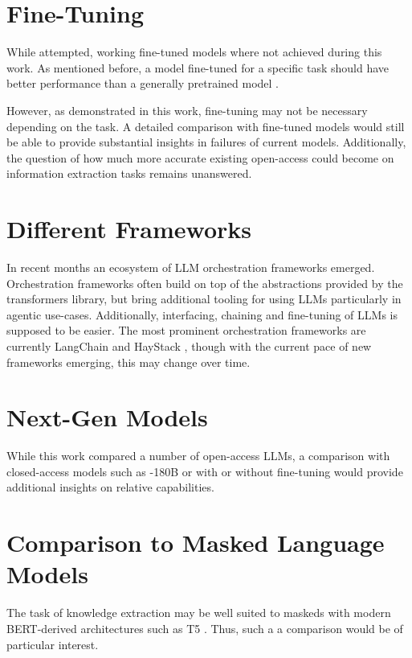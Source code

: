 \section{Fine-Tuning}\label{sec:out:sft}
While attempted, working fine-tuned models where not achieved during this work.
As mentioned before, a model fine-tuned for a specific task should have better performance than a generally pretrained model \cite{zhao_finetuning_2021}.

However, as demonstrated in this work, fine-tuning may not be necessary depending on the task.
A detailed comparison with fine-tuned models would still be able to provide substantial insights in failures of current models.
Additionally, the question of how much more accurate existing open-access  could become on information extraction tasks remains unanswered.

\section{Different Frameworks}\label{sub:frameworks}
In recent months an ecosystem of \gls{LLM} orchestration frameworks emerged.
Orchestration frameworks often build on top of the abstractions provided by the \acrshort{transformers} library, but bring additional tooling for using \glspl{LLM} particularly in agentic use-cases.
Additionally, interfacing, chaining and fine-tuning of \glspl{LLM} is supposed to be easier.
The most prominent orchestration frameworks are currently LangChain \cite{langchain_2023} and HayStack \cite{haystack_2023}, though with the current pace of new frameworks emerging, this may change over time.


\section{Next-Gen Models}\label{sec:next-gen}
While this work compared a number of open-access \glspl{LLM}, a comparison with closed-access  models such as -180B or  with or without fine-tuning would provide additional insights on relative capabilities.


\section{Comparison to Masked Language Models}\label{sec:masked}
The task of knowledge extraction may be well suited to \glspl{masked} with modern \gls{BERT}-derived architectures such as T5 \cite{raffel_exploring_2020}.
Thus, such a a comparison would be of particular interest.


